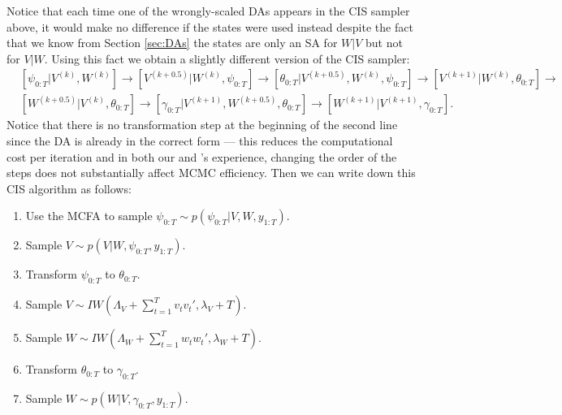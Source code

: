 \documentclass{article}
\begin{document}
Notice that each time one of the wrongly-scaled DAs appears in the CIS sampler above, it would make no difference if the states were used instead despite the fact that we know from Section \ref{sec:DAs} the states are only an SA for $W|V$ but not for $V|W$. Using this fact we obtain a slightly different version of the CIS sampler:
\begin{align*}
&[\psi_{0:T}|V^{(k)},W^{(k)}] \to [V^{(k+0.5)}|W^{(k)},\psi_{0:T}] \to [\theta_{0:T}|V^{(k+0.5)},W^{(k)},\psi_{0:T}] \to [V^{(k+1)}|W^{(k)},\theta_{0:T}]\to\\
&[W^{(k+0.5)}|V^{(k)},\theta_{0:T}] \to [\gamma_{0:T}|V^{(k+1)},W^{(k+0.5)},\theta_{0:T}]\to [W^{(k+1)}|V^{(k+1)},\gamma_{0:T}].
\end{align*}
Notice that there is no transformation step at the beginning of the second line since the DA is already in the correct form --- this reduces the computational cost per iteration and in both our and 's experience, changing the order of the steps does not substantially affect MCMC efficiency. Then we can write down this CIS algorithm as follows:
\begin{enumerate}
\item Use the MCFA to sample $\psi_{0:T} \sim p(\psi_{0:T}|V,W,y_{1:T})$.
\item Sample $V \sim p(V|W,\psi_{0:T},y_{1:T})$.
\item Transform $\psi_{0:T}$ to $\theta_{0:T}$.
\item Sample $V \sim IW\left(\Lambda_V + \sum_{t=1}^Tv_tv_t',\lambda_V + T\right)$.
\item Sample $W \sim IW\left(\Lambda_W + \sum_{t=1}^Tw_tw_t',\lambda_{W} + T\right)$.
\item Transform $\theta_{0:T}$ to $\gamma_{0:T}$.
\item Sample $W \sim p(W|V,\gamma_{0:T},y_{1:T})$.
\end{enumerate}
\end{document}
